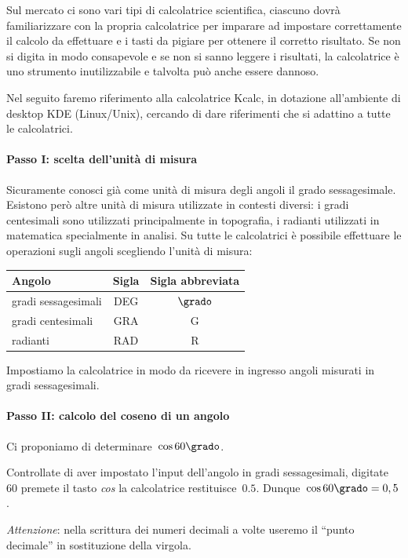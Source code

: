 Sul mercato ci sono vari tipi di calcolatrice scientifica, ciascuno dovrà 
familiarizzare con la propria calcolatrice per imparare
ad impostare correttamente il calcolo da effettuare e i tasti da pigiare per 
ottenere il corretto risultato. Se non si digita in
modo consapevole e se non si sanno leggere i risultati, la calcolatrice è uno 
strumento inutilizzabile e talvolta può anche essere dannoso.

Nel seguito faremo riferimento alla calcolatrice Kcalc, in dotazione 
all'ambiente di desktop KDE (Linux/Unix), cercando di dare
riferimenti che si adattino a tutte le calcolatrici.

\paragraph{Passo I: scelta dell'unità di misura}

Sicuramente conosci già come unità di misura degli angoli il grado 
sessagesimale. Esistono però altre unità di misura utilizzate in contesti 
diversi:
i gradi centesimali sono utilizzati principalmente in topografia, i radianti 
utilizzati in matematica specialmente in analisi.
Su tutte le calcolatrici è possibile effettuare le operazioni sugli angoli 
scegliendo l'unità di misura:
\begin{center}
\begin{tabular}{lcc}
\toprule
Angolo & Sigla & Sigla abbreviata \\
\midrule
gradi sessagesimali & DEG & $\grado$ \\
gradi centesimali   & GRA & G \\
radianti            & RAD & R \\
\bottomrule
\end{tabular}
\end{center}
Impostiamo la calcolatrice in modo da ricevere in ingresso angoli misurati in 
gradi sessagesimali.

\paragraph{Passo II: calcolo del coseno di un angolo}
Ci proponiamo di determinare~$\cos 60\grado$.

Controllate di aver impostato l'input dell'angolo in gradi sessagesimali,
digitate~$60 $ premete il tasto \emph{cos} la calcolatrice restituisce~$0.5$.
Dunque~$\cos 60\grado=0,5$.

\emph{Attenzione}: nella scrittura dei numeri decimali a volte useremo 
il ``punto decimale'' in sostituzione della virgola.

